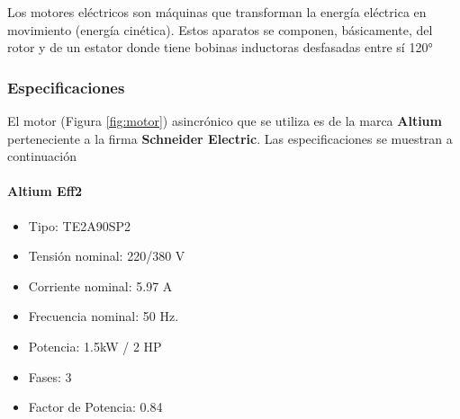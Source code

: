 
	\begin{tcolorbox}[colback=blue!5!white,colframe=blue!75!black,title=Definición]

	Los motores eléctricos son máquinas que transforman la energía eléctrica en movimiento (energía cinética). Estos aparatos se componen, básicamente, del rotor y de un estator donde tiene bobinas inductoras desfasadas entre sí 120°\end{tcolorbox}

		
	

\subsubsection{Especificaciones}

	El motor (Figura \ref{fig:motor}) asincrónico que se utiliza es de la marca \textbf{Altium} perteneciente a la firma \textbf{Schneider Electric}. Las especificaciones se muestran a continuación \\
	\paragraph*{Altium Eff2}
	
\begin{minipage}[t]{.5\textwidth}
	\begin{itemize}
		\item Tipo: TE2A90SP2
		\item Tensión nominal: 220/380 V
		\item Corriente nominal: 5.97 A 
		\item Frecuencia nominal:  50 Hz.
		\item Potencia: 1.5kW / 2 HP
		\item Fases: 3
		\item Factor de Potencia: 0.84
	\end{itemize}
\end{minipage}	
\begin{minipage}[t]{.5\textwidth}
	\centering{}
	\label{fig:motor}

 \end{minipage}
	\newpage